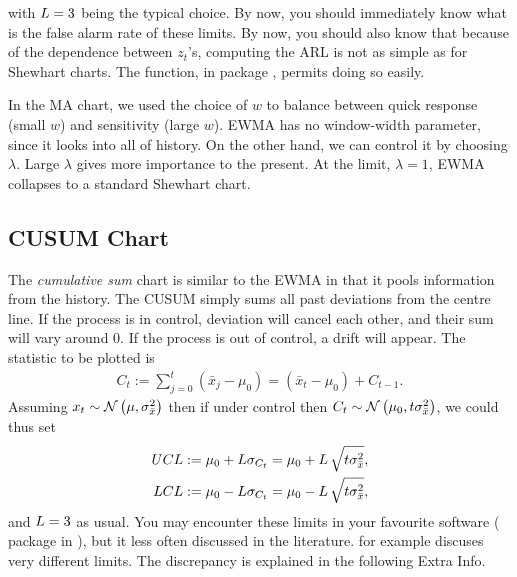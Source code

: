 with $L=3$ being the typical choice.
By now, you should immediately know what is the false alarm rate of these limits.
By now, you should also know that because of the dependence between $z_t$'s, computing the ARL is not as simple as for Shewhart charts. The  \R function, in package , permits doing so easily. 

In the MA chart, we used the choice of $w$ to balance between quick response (small $w$) and sensitivity (large $w$).
EWMA has no window-width parameter, since it looks into all of history. On the other hand, we can control it by choosing $\lambda$. 
Large $\lambda$ gives more importance to the present. At the limit, $\lambda=1$, EWMA collapses to a standard Shewhart chart.



\subsection[CUSUM]{CUSUM Chart}
The \emph{cumulative sum} chart is similar to the EWMA in that it pools information from the history. 
The CUSUM simply sums all past deviations from the centre line.
If the process is in control, deviation will cancel each other, and their sum will vary around $0$. 
If the process is out of control, a drift will appear. 
The statistic to be plotted is 
\begin{align}
	C_t:= \sum_{j=0}^{t}(\bar{x}_j-\mu_0) = (\bar{x}_t-\mu_0) + C_{t-1}.
\end{align} 
Assuming $x_t \sim \mathcal{N}\left(\mu, \sigma_{\bar{x}}^2\right)$ then if under control then $C_t \sim \mathcal{N}\left(\mu_0, t \sigma_{\bar{x}}^2\right)$, we could thus set 
\begin{align}
\label{eq:cusum_simple_limits}
\begin{split}
	UCL &:= \mu_0 + L \sigma_{C_t}= \mu_0 + L \, \sqrt{t \sigma_{\bar{x}}^2},  \\
	LCL &:= \mu_0 - L \sigma_{C_t}= \mu_0 - L \, \sqrt{t \sigma_{\bar{x}}^2},
\end{split}
\end{align}
and $L=3$ as usual. 
You may encounter these limits in your favourite software ( package in \R), but it less often discussed in the literature. \cite{montgomery_introduction_2007} for example discuses very different limits. The discrepancy is explained in the following Extra Info. 

